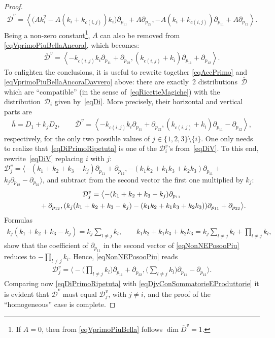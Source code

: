 \documentclass[pdftex]{sigma}
\newcommand{\D}{\mathcal{D}}
\newcommand{\Span}[1]{\left\langle #1 \right\rangle}
\numberwithin{equation}{section}
\begin{document}
\begin{proof}
\begin{gather}\label{eqVprimoPiuBellaAncora}
\overline{\D}^v= \Span{\big(Ak_i^2-A(k_i+k_{c(i,j)})k_i\big)\partial_{p_{11}}+A\partial_{p_{22}}, -A(k_i+k_{c(i,j)})\partial_{p_{11}}+A\partial_{p_{12}}}.
\end{gather}
Being a non-zero constant\footnote{If $A=0$, then from \eqref{eqVprimoPiuBella} follows $\dim\overline{D}^v=1$.}, $A$ can also be removed from \eqref{eqVprimoPiuBellaAncora}, which becomes:
 \begin{gather}\label{eqVprimoPiuBellaAncoraDavvero}
\overline{\D}^v= \Span{ -k_{c(i,j)}k_i\partial_{p_{11}}+\partial_{p_{22}}, (k_{c(i,j)}+k_i)\partial_{p_{11}}+\partial_{p_{12}}}.
\end{gather}
To enlighten the conclusions, it is useful to rewrite together \eqref{eqAccPrimo} and \eqref{eqVprimoPiuBellaAncoraDavvero} above: there are exactly~2 distributions~$\overline{\D}$ which are ``compatible'' (in the sense of~\eqref{eqRicetteMagiche}) with the distribution~$\D_i$ given by~\eqref{eqDi}. More precisely, their horizontal and vertical parts are
\begin{gather}
\overline{h} = D_1 +k_jD_2,\qquad
\overline{\D}^v = \Span{ -k_{c(i,j)}k_i\partial_{p_{11}}+\partial_{p_{22}}, (k_{c(i,j)}+k_i)\partial_{p_{11}}-\partial_{p_{12}}},\label{eqDiPrimoRipetuta}
\end{gather}
respectively, for the only two possible values of $ j\in \{1,2,3\}{\setminus}\{i\}$. One only needs to reali\-ze that~\eqref{eqDiPrimoRipetuta} is one of the $\D_i^v$'s from~\eqref{eqDiV}.
To this end, rewrite~\eqref{eqDiV} replacing $i$ with $j$:
$\D_j^v=\langle -(k_1+k_2+k_3-k_j) \partial_{p_{11}} + \partial_{p_{12}}, -(k_1k_2+k_1k_3+k_2k_3)\partial_{p_{11}}+$ $k_j \partial_{p_{12}}- \partial_{p_{22}} \rangle$,
and subtract from the second vector the f\/irst one multiplied by $k_j$:
\begin{gather}
\D_j^v=\big\langle {-}(k_1+k_2+k_3-k_j) \partial_{p_{11}} \nonumber\\
\hphantom{\D_j^v=\big\langle}{} + \partial_{p_{12}}, (k_j(k_1+k_2+k_3-k_j)-(k_1k_2+k_1k_3+k_2k_3))\partial_{p_{11}} + \partial_{p_{22}} \big\rangle.\label{eqNonNEPosooPiu}
\end{gather}
Formulas
\begin{gather*}
k_j(k_1+k_2+k_3-k_j) = k_j\sum_{l\neq j}k_l, \qquad
k_1k_2+k_1k_3+k_2k_3 = k_j\sum_{l\neq j}k_l +\prod_{l\neq j}k_l,
\end{gather*}
show that the coef\/f\/icient of $\partial_{p_{11}} $ in the second vector of \eqref{eqNonNEPosooPiu} reduces to $-\prod\limits_{l\neq j}k_l$. Hence, \eqref{eqNonNEPosooPiu} reads
\begin{gather}\label{eqDjvConSommatorieEProduttorie}
\D_j^v=\bigg\langle{-}\bigg(\prod_{l\neq j}k_l \bigg)\partial_{p_{11}} + \partial_{p_{22}},\bigg( \sum_{l\neq j}k_l\bigg) \partial_{p_{11}} - \partial_{p_{12}} \bigg\rangle.
\end{gather}
Comparing now \eqref{eqDiPrimoRipetuta} with \eqref{eqDjvConSommatorieEProduttorie} it is evident that $\overline{\D}^v$ must equal $\D_j^v$, with $j\neq i$, and the proof of the ``homogeneous'' case is complete.


\end{proof}
\end{document}
